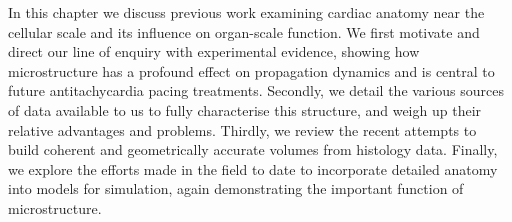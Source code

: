   In this chapter we discuss previous work examining cardiac anatomy near the cellular scale and its influence on organ-scale function. We first motivate and direct our line of enquiry with experimental evidence, showing how microstructure has a profound effect on propagation dynamics and is central to future antitachycardia pacing treatments. Secondly, we detail the various sources of data available to us to fully characterise this structure, and weigh up their relative advantages and problems. Thirdly, we review the recent attempts to build coherent and geometrically accurate volumes from histology data. Finally, we explore the efforts made in the field to date to incorporate detailed anatomy into models for simulation, again demonstrating the important function of microstructure.

